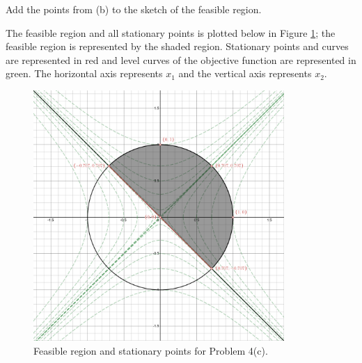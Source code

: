 Add the points from (b) to the sketch of the feasible region.

\begin{solution}
    The feasible region and all stationary points is plotted below in Figure \ref{fig:problem_4c}; the feasible region 
    is represented by the shaded region. Stationary points and curves are represented in red and level curves of the 
    objective function are represented in green. The horizontal axis represents $x_1$ and the vertical axis represents 
    $x_2$.

    \begin{figure}[h]
        \centering
        \includegraphics*[width=0.85\textwidth]{problem_4c.png}
        \caption{Feasible region and stationary points for Problem 4(c).}
        \label{fig:problem_4c}
    \end{figure}
\end{solution}